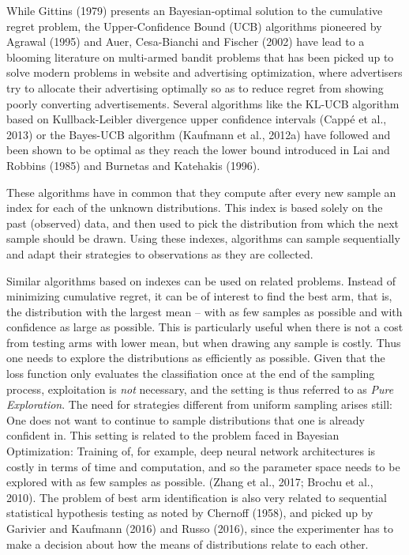 \documentclass[11pt,]{article}
\begin{document}
While Gittins (1979) presents an Bayesian-optimal solution to the
cumulative regret problem, the Upper-Confidence Bound (UCB) algorithms
pioneered by Agrawal (1995) and Auer, Cesa-Bianchi and Fischer (2002)
have lead to a blooming literature on multi-armed bandit problems that
has been picked up to solve modern problems in website and advertising
optimization, where advertisers try to allocate their advertising
optimally so as to reduce regret from showing poorly converting
advertisements. Several algorithms like the KL-UCB algorithm based on
Kullback-Leibler divergence upper confidence intervals (Cappé et al.,
2013) or the Bayes-UCB algorithm (Kaufmann et al., 2012a) have followed
and been shown to be optimal as they reach the lower bound introduced in
Lai and Robbins (1985) and Burnetas and Katehakis (1996).

These algorithms have in common that they compute after every new sample
an index for each of the unknown distributions. This index is based
solely on the past (observed) data, and then used to pick the
distribution from which the next sample should be drawn. Using these
indexes, algorithms can sample sequentially and adapt their strategies
to observations as they are collected.

Similar algorithms based on indexes can be used on related problems.
Instead of minimizing cumulative regret, it can be of interest to find
the best arm, that is, the distribution with the largest mean -- with as
few samples as possible and with confidence as large as possible. This
is particularly useful when there is not a cost from testing arms with
lower mean, but when drawing any sample is costly. Thus one needs to
explore the distributions as efficiently as possible. Given that the
loss function only evaluates the classifiation once at the end of the
sampling process, exploitation is \emph{not} necessary, and the setting
is thus referred to as \emph{Pure Exploration}. The need for strategies
different from uniform sampling arises still: One does not want to
continue to sample distributions that one is already confident in. This
setting is related to the problem faced in Bayesian Optimization:
Training of, for example, deep neural network architectures is costly in
terms of time and computation, and so the parameter space needs to be
explored with as few samples as possible. (Zhang et al., 2017; Brochu et
al., 2010). The problem of best arm identification is also very related
to sequential statistical hypothesis testing as noted by Chernoff
(1958), and picked up by Garivier and Kaufmann (2016) and Russo (2016),
since the experimenter has to make a decision about how the means of
distributions relate to each other.
\end{document}
